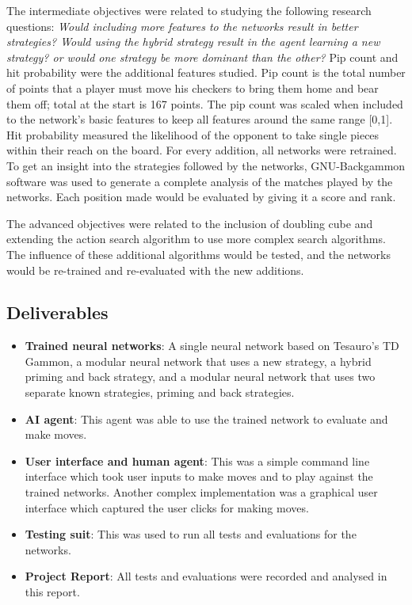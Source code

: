 \documentclass[12pt,a4paper]{article}
\begin{document}
The intermediate objectives were related to studying the following research questions: \textit{Would including more features to the networks result in better strategies? Would using the hybrid strategy result in the agent learning a new strategy? or would one strategy be more dominant than the other?} Pip count and hit probability were the additional features studied. Pip count is the total number of points that a player must move his checkers to bring them home and bear them off; total at the start is 167 points. The pip count was scaled when included to the network's basic features to keep all features around the same range [0,1]. Hit probability measured the likelihood of the opponent to take single pieces within their reach on the board. For every addition, all networks were retrained. To get an insight into the strategies followed by the networks, GNU-Backgammon software was used to generate a complete analysis of the matches played by the networks. Each position made would be evaluated by giving it a score and rank. 

The advanced objectives were related to the inclusion of doubling cube and extending the action search algorithm to use more complex search algorithms. The influence of these additional algorithms would be tested, and the networks would be re-trained and re-evaluated with the new additions. 

\subsection{Deliverables}
\begin{itemize}
    \item \textbf{Trained neural networks}: A single neural network based on Tesauro's TD Gammon, a modular neural network that uses a new strategy, a hybrid priming and back strategy, and a modular neural network that uses two separate known strategies, priming and back strategies.
    \item \textbf{AI agent}: This agent was able to use the trained network to evaluate and make moves.
    \item \textbf{User interface and human agent}: This was a simple command line interface which took user inputs to make moves and to play against the trained networks. Another complex implementation was a graphical user interface which captured the user clicks for making moves.
    \item \textbf{Testing suit}: This was used to run all tests and evaluations for the networks.
    \item \textbf{Project Report}: All tests and evaluations were recorded and analysed in this report.
\end{itemize}
\end{document}
